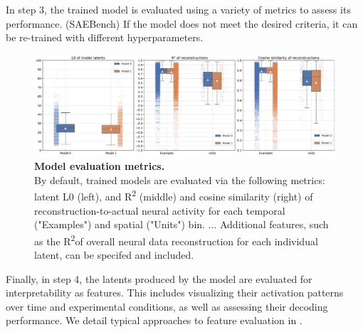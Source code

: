 In step 3, the trained model is evaluated using a variety of metrics to assess its performance. (SAEBench) If the model does not meet the desired criteria, it can be re-trained with different hyperparameters. 

\begin{figure}[h]
    \centering
    \includegraphics[width=\linewidth]{figures/model_eval.pdf}
    \caption{
        \textbf{Model evaluation metrics.} \\
        \small By default, trained models are evaluated via the following metrics: latent L0 (left), and R\textsuperscript{2} (middle) and cosine similarity (right) of reconstruction-to-actual neural activity for each temporal ("Examples") and spatial ("Units") bin. ... Additional features, such as the R\textsuperscript{2}of overall neural data reconstruction for each individual latent, can be specifed and included.
    }
    \label{fig:model_eval}
\end{figure}

Finally, in step 4, the latents produced by the model are evaluated for interpretability as features. This includes visualizing their activation patterns over time and experimental conditions, as well as assessing their decoding performance. We detail typical approaches to feature evaluation in .

